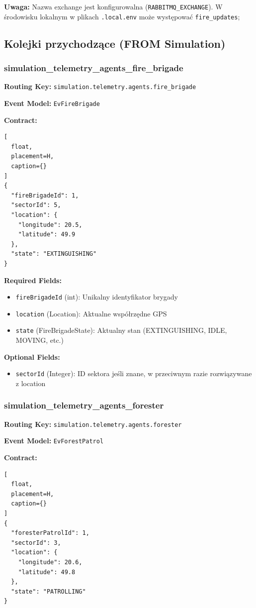 \documentclass[11pt,a4paper] {article}
\begin{document}
\textbf{Uwaga:} Nazwa exchange jest konfigurowalna (\texttt{RABBITMQ\_EXCHANGE}). W środowisku lokalnym w plikach \texttt{.local.env} może występować \texttt{fire\_updates};

\subsection{Kolejki przychodzące (FROM Simulation)}

\subsubsection{simulation\_telemetry\_agents\_fire\_brigade}

\textbf{Routing Key:} \texttt{simulation.telemetry.agents.fire\_brigade}

\textbf{Event Model:} \texttt{EvFireBrigade}

\textbf{Contract:}
\begin{lstlisting}[
  float,
  placement=H,
  caption={}
]
{
  "fireBrigadeId": 1,
  "sectorId": 5,
  "location": {
    "longitude": 20.5,
    "latitude": 49.9
  },
  "state": "EXTINGUISHING"
}
\end{lstlisting}

\textbf{Required Fields:}
\begin{itemize}
    \item \texttt{fireBrigadeId} (int): Unikalny identyfikator brygady
    \item \texttt{location} (Location): Aktualne współrzędne GPS
    \item \texttt{state} (FireBrigadeState): Aktualny stan (EXTINGUISHING, IDLE, MOVING, etc.)
\end{itemize}

\textbf{Optional Fields:}
\begin{itemize}
    \item \texttt{sectorId} (Integer): ID sektora jeśli znane, w przeciwnym razie rozwiązywane z location
\end{itemize}

\subsubsection{simulation\_telemetry\_agents\_forester}

\textbf{Routing Key:} \texttt{simulation.telemetry.agents.forester}

\textbf{Event Model:} \texttt{EvForestPatrol}

\textbf{Contract:}
\begin{lstlisting}[
  float,
  placement=H,
  caption={}
]
{
  "foresterPatrolId": 1,
  "sectorId": 3,
  "location": {
    "longitude": 20.6,
    "latitude": 49.8
  },
  "state": "PATROLLING"
}
\end{lstlisting}
\end{document}
